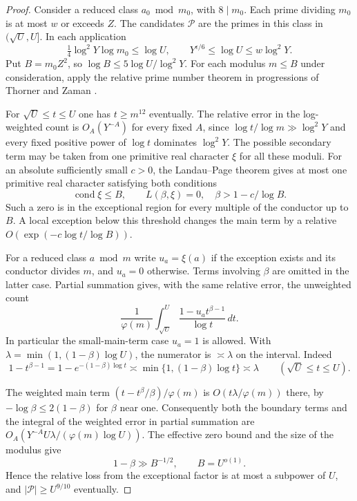 \begin{proof}
Consider a reduced class \(a_0\bmod m_0\), with \(8\mid m_0\).
Each prime dividing \(m_0\) is at most \(w\) or exceeds \(Z\).
The candidates \(\mathcal P\) are the primes in this class in
\((\sqrt U,U]\). In each application
\[
  \tfrac14\log^2Y\log m_0\le\log U,\qquad
  Y^{\epsilon/6}\le\log U\le w\log^2Y .
\]
Put \(B=m_0 Z^2\), so \(\log B\le5\log U/\log^2Y\).
For each modulus \(m\le B\) under consideration, apply the relative
prime number theorem in progressions of Thorner and Zaman
\cite[Corollary 1.4 and Remark 1.5]{tz-progressions}.

For \(\sqrt U\le t\le U\) one has \(t\ge m^{12}\) eventually.
The relative error in the log-weighted count is \(O_A(Y^{-A})\)
for every fixed \(A\), since \(\log t/\log m\gg\log^2Y\) and
every fixed positive power of \(\log t\) dominates \(\log^2Y\).
The possible secondary term may be taken from one primitive real
character \(\xi\) for all these moduli. For an absolute sufficiently small \(c>0\), the Landau--Page theorem \cite[Lemma 7.1]{landau-page} gives at most one primitive real character satisfying both conditions
\[
 \operatorname{cond}\xi\le B,\qquad L(\beta,\xi)=0,\quad \beta>1-c/\log B.
\]
Such a zero is in the
exceptional region for every multiple of the conductor up to \(B\).
A local exception below this threshold changes the main term by
a relative \(O(\exp(-c\log t/\log B))\).

For a reduced class \(a\bmod m\) write \(u_a=\xi(a)\) if the
exception exists and its conductor divides \(m\), and \(u_a=0\)
otherwise. Terms involving \(\beta\) are omitted in the latter
case. Partial summation gives, with the same relative error,
the unweighted count
\[
  \frac{1}{\varphi(m)}\int_{\sqrt U}^U
                   \frac{1-u_a t^{\beta-1}}{\log t}\,dt .
\]
In particular the small-main-term case \(u_a=1\) is allowed.
With \(\lambda=\min(1,(1-\beta)\log U)\), the numerator is
\(\asymp\lambda\) on the interval. Indeed
\[
 1-t^{\beta-1}=1-e^{-(1-\beta)\log t}
 \asymp\min\{1,(1-\beta)\log t\}\asymp\lambda
 \qquad(\sqrt U\le t\le U).
\]

The weighted main term
\((t-t^\beta/\beta)/\varphi(m)\) is \(O(t\lambda/\varphi(m))\)
there, by \(-\log\beta\le2(1-\beta)\) for \(\beta\) near one.
Consequently both the boundary terms and the integral of the
weighted error in partial summation are
\(O_A(Y^{-A}U\lambda/(\varphi(m)\log U))\).
The effective zero bound \cite[(1.2)]{tz-progressions} and the size of the modulus give
\[
 1-\beta\gg B^{-1/2},\qquad B=U^{o(1)}.
\]
Hence the relative loss from the exceptional factor is at most a subpower of \(U\), and \(|\mathcal P|\ge U^{9/10}\) eventually.


\end{proof}
